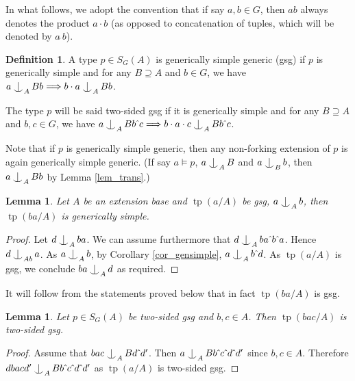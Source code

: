 \documentclass{amsart}
\makeatletter
\numberwithin{equation}{section}
\newtheorem{lemme}[thm]{Lemma}
\theoremstyle{definition}
\newtheorem{defi}[thm]{Definition}
\theoremstyle{mystyle}
\theoremstyle{remark}
\DeclareMathOperator{\tp}{tp}
\def\indsym#1#2{%
 \setbox0=\hbox{$\m@th#1x$}%
 \kern\wd0%
 \hbox to 0pt{\hss$\m@th#1\mid$\hbox to 0pt{$\m@th#1^{#2}$\hss}\hss}%
 \lower.9\ht0\hbox to 0pt{\hss$\m@th#1\smile$\hss}%
 \kern\wd0}
\newcommand{\ind}[1][]{\mathop{\mathpalette\indsym{#1}}}
\makeatother
\begin{document}
In what follows, we adopt the convention that if say $a,b\in G$, then $ab$ always denotes the product $a\cdot b$ (as opposed to concatenation of tuples, which will be denoted by $a\hat{~}b$).
\begin{defi}
A type $p\in S_G(A)$ is generically simple generic (gsg) if $p$ is generically simple and for any $B\supseteq A$ and $b\in G$, we have $a\ind_A Bb \Longrightarrow b \cdot a\ind_A B b$.

The type $p$ will be said two-sided gsg if it is generically simple and for any $B\supseteq A$ and $b,c\in G$, we have $a\ind_A Bb\hat{~}c \Longrightarrow b \cdot a\cdot c\ind_A Bb\hat{~}c$.
\end{defi}


Note that if $p$ is generically simple generic, then any non-forking extension of $p$ is again generically simple generic. (If say $a\models p$, $a\ind_A B$ and $a\ind_B b$, then $a\ind_A Bb$ by Lemma \ref{lem_trans}.)

\begin{lemme}\label{lem_trangsg}
Let $A$ be an extension base and $\tp(a/A)$ be gsg, $a\ind_A b$, then $\tp(ba/A)$ is generically simple.
\end{lemme}
\begin{proof}
Let $d\ind_A b a$. We can assume furthermore that $d\ind_A ba\hat{~}b\hat{~}a$. Hence $d\ind_{Ab} a$. As $a\ind_A b$, by Corollary \ref{cor_gensimple}, $a\ind_{A} b\hat{~}d$. As $\tp(a/A)$ is gsg, we conclude $ba\ind_A d$ as required.
\end{proof}

It will follow from the statements proved below that in fact $\tp(ba/A)$ is gsg.

\begin{lemme}\label{lem_gsgtranslate}
Let $p\in S_G(A)$ be two-sided gsg and $b,c\in A$. Then $\tp(bac/A)$ is two-sided gsg.
\end{lemme}
\begin{proof}
Assume that $bac \ind_A Bd\hat{~}d'$. Then $a\ind_A Bb\hat{~}c\hat{~}d\hat{~}d'$ since $b,c\in A$. Therefore $dbacd' \ind_A Bb\hat{~}c\hat{~}d\hat{~}d'$ as $\tp(a/A)$ is two-sided gsg.
\end{proof}
\end{document}
